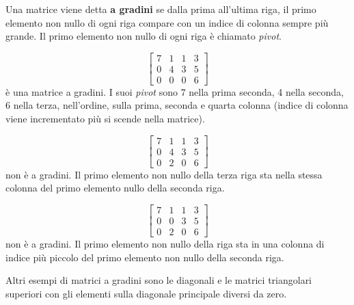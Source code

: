 \begin{defi}
  \label{defi:matrice6}
  Una matrice viene detta \textbf{a gradini} se dalla prima all'ultima
  riga, il primo elemento non nullo di ogni riga compare con un indice di
  colonna sempre più grande. Il primo elemento non nullo di ogni riga è
  chiamato \textit{pivot}.
  \begin{es}
    \label{es:matrice6-1}
    \begin{equation*}
      \begin{bmatrix}
        7 & 1 & 1 & 3 \\
        0 & 4 & 3 & 5 \\
        0 & 0 & 0 & 6
      \end{bmatrix}
    \end{equation*}
    è una matrice a gradini. I suoi \textit{pivot} sono 7 nella prima
    seconda, 4 nella seconda, 6 nella terza, nell'ordine, sulla prima,
    seconda e quarta colonna (indice di colonna viene incrementato più si
    scende nella matrice).
  \end{es}
  \begin{es}
    \label{es:matrice6-2}
    \begin{equation*}
      \begin{bmatrix}
        7 & 1 & 1 & 3 \\
        0 & 4 & 3 & 5 \\
        0 & 2 & 0 & 6
      \end{bmatrix}
    \end{equation*}
    non è a gradini. Il primo elemento non nullo della terza riga sta
    nella stessa colonna del primo elemento nullo della seconda riga.
  \end{es}
  \begin{es}
    \label{es:matrice6-3}
    \begin{equation*}
      \begin{bmatrix}
        7 & 1 & 1 & 3 \\
        0 & 0 & 3 & 5 \\
        0 & 2 & 0 & 6
      \end{bmatrix}
    \end{equation*}
    non è a gradini. Il primo elemento non nullo della riga sta in una
    colonna di indice più piccolo del primo elemento non nullo della
    seconda riga.
  \end{es}
  \begin{es}
    \label{es:matrice6-4}
    Altri esempi di matrici a gradini sono le diagonali e le matrici
    triangolari superiori con gli elementi sulla diagonale principale
    diversi da zero.
  \end{es}
\end{defi}

